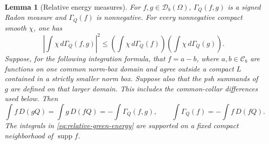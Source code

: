 \documentclass[11pt,a4paper]{article}
\numberwithin{equation}{section}
\newtheorem{lemma}[theorem]{Lemma}
\theoremstyle{definition}
\theoremstyle{remark}
\newcommand{\Cb}{\mathcal C_b}
\begin{document}
\begin{lemma}[Relative energy measures]
\label{lem:relative-energy-measures}
For $f,g\in\mathcal D_b(\Omega)$, $\Gamma_Q(f,g)$ is a signed Radon
measure and $\Gamma_Q(f)$ is nonnegative. For every nonnegative compact
smooth $\chi$, one has
\begin{equation}
\label{eq:relative-energy-CS}
 \left|\int\chi\,d\Gamma_Q(f,g)\right|^2
 \leq\left(\int\chi\,d\Gamma_Q(f)\right)
       \left(\int\chi\,d\Gamma_Q(g)\right).
\end{equation}
Suppose, for the following integration formula, that $f=a-b$, where
$a,b\in\Cb$ are functions on one common norm-box domain and agree
outside a compact $L$ contained in a strictly smaller norm box.
Suppose also that the psh summands of $g$ are defined on that larger
domain. This includes the common-collar differences used below.
Then
\begin{equation}
\label{eq:relative-green-energy}
 \int f\,D(gQ)=\int g\,D(fQ)
       =-\int\Gamma_Q(f,g),
 \qquad
 \int\Gamma_Q(f)=-\int f\,D(fQ).
\end{equation}
The integrals in \eqref{eq:relative-green-energy} are supported on a
fixed compact neighborhood of $\operatorname{supp}f$.
\end{lemma}
\end{document}
